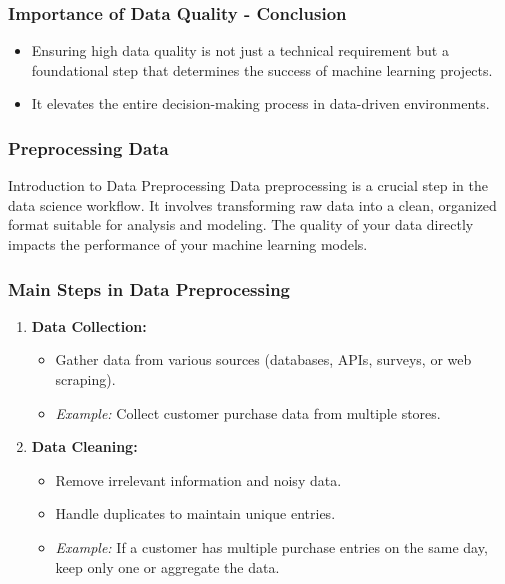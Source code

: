 \documentclass[aspectratio=169]{beamer}
\begin{document}
\begin{frame}[fragile]
    \frametitle{Importance of Data Quality - Conclusion}
    \begin{itemize}
        \item Ensuring high data quality is not just a technical requirement but a foundational step that determines the success of machine learning projects.
        \item It elevates the entire decision-making process in data-driven environments.
    \end{itemize}
\end{frame}

\begin{frame}[fragile]
    \frametitle{Preprocessing Data}
    \begin{block}{Introduction to Data Preprocessing}
        Data preprocessing is a crucial step in the data science workflow. It involves transforming raw data into a clean, organized format suitable for analysis and modeling. The quality of your data directly impacts the performance of your machine learning models.
    \end{block}
\end{frame}

\begin{frame}[fragile]
    \frametitle{Main Steps in Data Preprocessing}
    \begin{enumerate}
        \item \textbf{Data Collection:}
            \begin{itemize}
                \item Gather data from various sources (databases, APIs, surveys, or web scraping).
                \item \textit{Example:} Collect customer purchase data from multiple stores.
            \end{itemize}
        \item \textbf{Data Cleaning:}
            \begin{itemize}
                \item Remove irrelevant information and noisy data.
                \item Handle duplicates to maintain unique entries.
                \item \textit{Example:} If a customer has multiple purchase entries on the same day, keep only one or aggregate the data.
            \end{itemize}
    \end{enumerate}
\end{frame}
\end{document}
